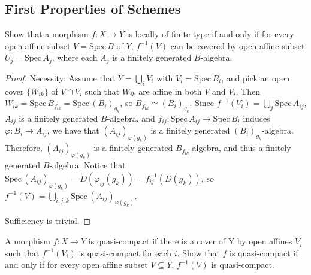 \subsection{First Properties of Schemes}

\begin{exe}
	\label{2.3.1}
	Show that a morphism $f: X\rightarrow Y $ is locally of finite type if and only if for every open affine
	subset $V=\mathrm{Spec}\,B$ of $Y$, $f^{-1}(V)$ can be covered by open affine subset $U_j=\mathrm{Spec}\,A_j$, where each $A_j$ is a
	finitely generated $B$-algebra.
\end{exe}

\begin{proof}
	Necessity: Assume that $Y=\bigcup_i V_i$ with $V_i= \mathrm{Spec}\,B_i$, and pick an open cover $\{W_{ik}\}$ of $ V\cap V_i$ such that $W_{ik}$ are affine in both $V$ and $V_i$. Then $W_{ik}=\mathrm{Spec}\,B_{f_{ik}}=\mathrm{Spec}\,(B_{i})_{g_k}$, so $B_{f_{ik}}\simeq (B_{i})_{g_k}$. Since $f^{-1}(V_i)=\bigcup_j \mathrm{Spec}\,A_{ij}$, $A_{ij}$ is a finitely generated $B$-algebra, and
	$f_{ij}:\mathrm{Spec}\,A_{ij}\rightarrow \mathrm{Spec}\,B_i$ induces $\varphi : B_i\rightarrow A_{ij} $, we have that $(A_{ij})_{\varphi(g_k)}$ is
	a finitely generated $(B_{i})_{g_k}$-algebra. Therefore, $(A_{ij})_{\varphi(g_k)}$ is a finitely generated $B_{f_{ik}}$-algebra, and thus a finitely generated $B$-algebra. Notice that $\mathrm{Spec}\,(A_{ij})_{\varphi(g_k)}=D(\varphi _{ij}(g_k))=f_{ij}^{-1}(D(g_k))$, so 
	$f^{-1}(V)=\bigcup_{i,j,k} \mathrm{Spec}\,(A_{ij})_{\varphi(g_k)}$.
	
	Sufficiency is trivial.
\end{proof}

\begin{exe}
	\label{2.3.2}
	A morphism $f: X \rightarrow Y$ is quasi-compact if there is a cover of Y by open affines $V_i$ such that
	$f^{-1}(V_i)$ is quasi-compact for each $i$. Show that $f$ is quasi-compact if and only if for every open affine subset $V\subseteq Y$,
	$f^{-1}(V)$ is quasi-compact.
\end{exe}

